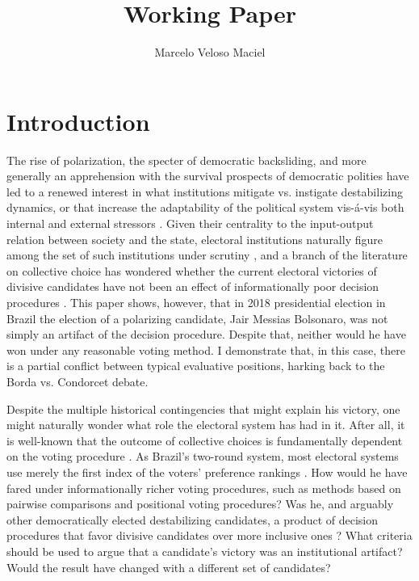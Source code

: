 \documentclass[hidelinks,11pt]{article}
\author{Marcelo Veloso Maciel}
\date{}
\title{Working Paper}
\begin{document}
\maketitle

\section{Introduction}

The rise of polarization, the specter of democratic backsliding, and more
generally an apprehension with the survival prospects of democratic polities
have led to a renewed interest in what institutions mitigate vs. instigate
destabilizing dynamics, or that increase the adaptability of the political
system vis-{\'a}-vis both internal and external stressors
\parencite{Bednare2113843118, chiopris2021wolf, tarko2014institutional}. Given
their centrality to the input-output relation between society and the state,
electoral institutions naturally figure among the set of such institutions under
scrutiny \parencite{Wange2021systems}, and a branch of the literature on
collective choice has wondered whether the current electoral victories of
divisive candidates have not been an effect of informationally poor decision
procedures \parencite{potthoff2021condorcet, kurrild2018trump, woon2020trump}.
This paper shows, however, that in 2018 presidential election in Brazil the
election of a polarizing candidate, Jair Messias Bolsonaro, was not simply an
artifact of the decision procedure. Despite that, neither would he have won
under any reasonable voting method. I demonstrate that, in this case, there is a
partial conflict between typical evaluative positions, harking back to the Borda
vs. Condorcet debate.

Despite the multiple historical contingencies that might explain his victory,
one might naturally wonder what role the electoral system has had in it. After
all, it is well-known that the outcome of collective choices is fundamentally
dependent on the voting procedure \parencite{riker1982liberalism}. As Brazil's
two-round system, most electoral systems use merely the first index of the
voters' preference rankings \parencite{grofman04_if_you_like_alter_vote}. How
would he have fared under informationally richer voting procedures, such as
methods based on pairwise comparisons and positional voting procedures? Was he,
and arguably other democratically elected destabilizing candidates, a product of
decision procedures that favor divisive candidates over more inclusive ones
\parencite{igersheim22_compar_votin_method}? What criteria should be used to
argue that a candidate's victory was an institutional artifact? Would the result
have changed with a different set of candidates?
\end{document}
